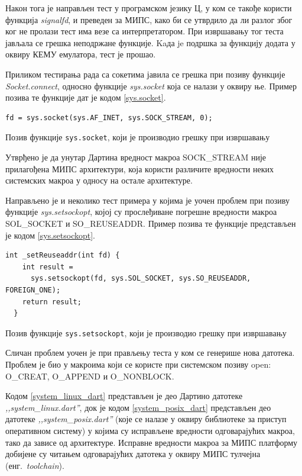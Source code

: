 \documentclass[12pt,oneside]{memoir}
\begin{document}
Након тога је направљен тест у програмском језику Ц, у ком се такође користи функција \textit{signalfd}, и преведен за МИПС, како би се утврдило да ли разлог због ког не пролази тест има везе са интерпретатором. При извршавању тог теста јављала се грешка неподржане функције. Kaда je подршка за функцију додата у оквиру КЕМУ емулатора, тест је прошао.

Приликом тестирања рада са сокетима јавила се грешка при позиву функције \textit{Socket.connect}, односно функције \textit{sys.socket} која се налази у оквиру ње. Пример позива те функције дат је кодом \ref{sys.socket}.\\

\begin{listing}
\begin{verbatim}
fd = sys.socket(sys.AF_INET, sys.SOCK_STREAM, 0);
\end{verbatim}
\caption{Позив функције \texttt{sys.socket}, који је производио грешку при извршавању }
\label{sys.socket}
\end{listing}

Утврђено је да унутар Дартина вредност макроа SOCK\_STREAM није прилагођена МИПС архитектури, која користи различите вредности неких системских макроа у односу на остале архитектуре.

Направљено је и неколико тест примера у којима је уочен проблем при позиву функције \textit{sys.setsockopt}, којој су прослеђиване погрешне вредности макроа SOL\_SOCKET и SO\_REUSEADDR. Пример позива те функције представљен је кодом \ref{sys.setsockopt}.\\

\begin{listing}
\begin{verbatim}
int _setReuseaddr(int fd) {
    int result =
      sys.setsockopt(fd, sys.SOL_SOCKET, sys.SO_REUSEADDR, FOREIGN_ONE);
    return result;
  }
\end{verbatim}
\caption{Позив функције \texttt{sys.setsockopt}, који је производио грешку при извршавању }
\label{sys.setsockopt}
\end{listing}

Сличан проблем уочен је при прављењу теста у ком се генерише нова датотека. Проблем је био у макроима који се користе при системском позиву open: O\_CREAT, O\_APPEND и O\_NONBLOCK.

Кодом \ref{system_linux_dart} представљен је део Дартино датотеке \textit{,,system\_linux.dart''}, док је кодом \ref{system_posix_dart} представљен део датотеке \textit{,,system\_posix.dart''} (које се налазе у оквиру библиотеке за приступ оперативном систему) у којима су исправљене вредности одговарајућих макроа, тако да зависе од архитектуре. Исправне вредности макроа за МИПС платформу добијене су читањем одговарајућих датотека у оквиру МИПС тулчејна (енг.~\textit{toolchain}). \\
\end{document}
